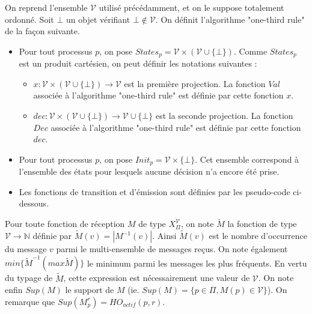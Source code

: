 \documentclass{article}
\begin{document}
On reprend l'ensemble $\mathcal{V}$ utilisé précédamment, et on le suppose totalement ordonné. Soit $\bot$ un objet vérifiant $\bot \notin \mathcal{V}$.
On définit l'algorithme "one-third rule" de la façon suivante.
\begin{itemize}
	\item Pour tout processus $p$, on pose $States_p = \mathcal{V} \times (\mathcal{V} \cup \{ \bot \})$.
	Comme $States_p$ est un produit cartésien, on peut définir les notations suivantes :
	\begin{itemize}

		\item $x : \mathcal{V} \times (\mathcal{V} \cup \{ \bot \}) \rightarrow \mathcal{V}$ est la première projection.
			La fonction $Val$ associée à l'algorithme "one-third rule" est définie par cette fonction $x$.
		\item $dec : \mathcal{V} \times (\mathcal{V} \cup \{ \bot \}) \rightarrow \mathcal{V} \cup \{\bot\}$ est la seconde projection.
			La fonction $Dec$ associée à l'algorithme "one-third rule" est définie par cette fonction $dec$.

	\end{itemize}
\item Pour tout processus $p$, on pose $Init_p = \mathcal{V} \times \{ \bot \}$. Cet ensemble correspond à l'ensemble des états pour lesquels aucune décision n'a encore été prise.
\item Les fonctions de transition et d'émission sont définies par les pseudo-code ci-dessous.
\end{itemize}
Pour toute fonction de réception $M$ de type $X_\Pi^\mathcal{V}$, on note $\widetilde{M}$ la fonction de type $\mathcal{V} \rightarrow \mathds{N}$ définie par $\widetilde{M}(v) = |M^{-1}(v)|$.
Ainsi $\widetilde{M}(v)$ est le nombre d'occurrence du message $v$ parmi le multi-ensemble de messages reçus.
On note également $min \{\widetilde{M}^{-1} (max \widetilde{M})\}$  le minimum parmi les messages les plus fréquents. En vertu du typage de $\widetilde{M}$, cette expression est nécessairement
une valeur de $\mathcal{V}$.
On note enfin $Sup(M)$ le support de $M$ (ie. $Sup(M) = \{p \in \Pi, M(p) \in \mathcal{V}\}$). On remarque que $Sup(M_p^r) = HO_{actif}(p,r)$. 
\end{document}
